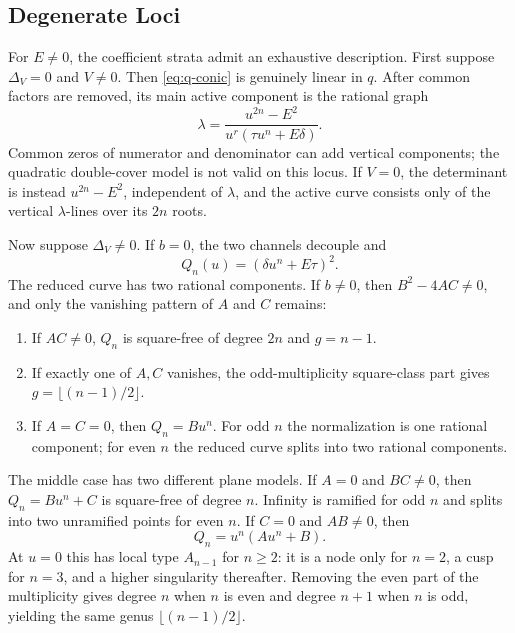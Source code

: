 \documentclass[11pt,reqno]{amsart}
\theoremstyle{remark}
\begin{document}
\subsection{Degenerate Loci}

For $E\ne0$, the coefficient strata admit an exhaustive description.  First
suppose $\Delta_V=0$ and $V\ne0$.  Then \eqref{eq:q-conic} is genuinely linear
in $q$.  After common factors are removed, its main active component is the
rational graph
\begin{equation}\label{eq:delta-zero-param}
 \lambda=
 \frac{u^{2n}-E^2}{u^r(\tau u^n+E\delta)}.
\end{equation}
Common zeros of numerator and denominator can add vertical components; the
quadratic double-cover model is not valid on this locus.
If $V=0$, the determinant is instead $u^{2n}-E^2$, independent of $\lambda$,
and the active curve consists only of the vertical $\lambda$-lines over its
$2n$ roots.

Now suppose $\Delta_V\ne0$.  If $b=0$, the two channels decouple and
\begin{equation}\label{eq:bzero-square}
 Q_n(u)=(\delta u^n+E\tau)^2.
\end{equation}
The reduced curve has two rational components.  If $b\ne0$, then
$B^2-4AC\ne0$, and only the vanishing pattern of $A$ and $C$ remains:
\begin{enumerate}[label=\textnormal{(\alph*)}]
\item If $AC\ne0$, $Q_n$ is square-free of degree $2n$ and $g=n-1$.
\item If exactly one of $A,C$ vanishes, the odd-multiplicity square-class
part gives $g=\lfloor(n-1)/2\rfloor$.
\item If $A=C=0$, then $Q_n=Bu^n$.  For odd $n$ the normalization is one
rational component; for even $n$ the reduced curve splits into two rational
components.
\end{enumerate}

The middle case has two different plane models.  If $A=0$ and $BC\ne0$,
then $Q_n=Bu^n+C$ is square-free of degree $n$.  Infinity is ramified for
odd $n$ and splits into two unramified points for even $n$.  If $C=0$ and
$AB\ne0$, then
\begin{equation}\label{eq:Czero-model}
 Q_n=u^n(Au^n+B).
\end{equation}
At $u=0$ this has local type $A_{n-1}$ for $n\geq2$: it is a node only for
$n=2$, a cusp for $n=3$, and a higher singularity thereafter.  Removing the
even part of the multiplicity gives degree $n$ when $n$ is even and degree
$n+1$ when $n$ is odd, yielding the same genus
$\lfloor(n-1)/2\rfloor$.
\end{document}
